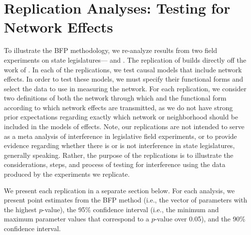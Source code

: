 \documentclass[12pt]{article}
\begin{document}
\section{Replication Analyses: Testing for Network Effects}

To illustrate the BFP methodology, we re-analyze results from two field experiments on state legislatures---\citet{butler2011can} and \citet{bergan2015call}. The replication of  \citet{butler2011can} builds directly off the work of \citet{coppock2014information}. In each of the replications, we test causal models that include network effects. In order to test these models, we must specify their functional forms and select the data to use in measuring the network. For each replication, we consider two definitions of both the network through which and the functional form according to which network effects are transmitted, as we do not have strong prior expectations regarding exactly which network or neighborhood should be included in the models of effects.  Note, our replications are not intended to serve as a meta analysis of interference in legislative field experiments, or to provide evidence regarding whether there is or is not interference in state legislatures, generally speaking. Rather, the purpose of the replications is to illustrate the considerations, steps, and process of testing for interference using the data produced by the experiments we replicate.

We present each replication in a separate section below. For each analysis, we present point estimates from the BFP method (i.e., the vector of parameters with the highest $p$-value), the 95\% confidence interval (i.e., the minimum and maximum parameter values that correspond to a $p$-value over 0.05), and the 90\% confidence interval. 

\subsection{\citet{butler2011can}}
\end{document}
